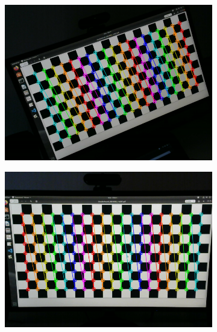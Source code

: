 \documentclass[../Head/report.tex]{subfiles}
\begin{document}
\begin{figure}[H]
    \centering
    \begin{subfigure}[t]{.27\textwidth}
        \centering
        \includegraphics[width=\textwidth]{../Figures/camera_calibration/img5.png}
        \caption{}
        \label{fig:calibration_one}
    \end{subfigure}
     \hspace{0.2em}
    \begin{subfigure}[t]{.27\textwidth}
        \centering
        \includegraphics[width=\textwidth]{../Figures//camera_calibration/img8.png}
        \caption{}
        \label{fig:calibration_two}
    \end{subfigure}
         \hspace{0.2em}

\end{figure}
\end{document}
